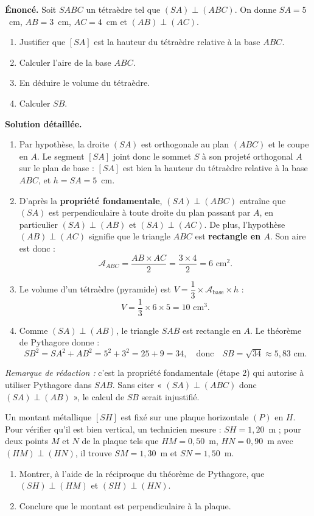 \documentclass[11pt]{article}
\newcommand{\cle}[1]{{\popxbold\color{popdark}#1}}
\begin{document}
\begin{exoresolu}
\textbf{Énoncé.} Soit $SABC$ un tétraèdre tel que $(SA) \perp (ABC)$. On donne $SA = 5$~cm, $AB = 3$~cm, $AC = 4$~cm et $(AB) \perp (AC)$.
\begin{enumerate}
\item Justifier que $[SA]$ est la hauteur du tétraèdre relative à la base $ABC$.
\item Calculer l'aire de la base $ABC$.
\item En déduire le volume du tétraèdre.
\item Calculer $SB$.
\end{enumerate}
\tcblower
\textbf{Solution détaillée.}
\begin{enumerate}
\item Par hypothèse, la droite $(SA)$ est orthogonale au plan $(ABC)$ et le coupe en $A$. Le segment $[SA]$ joint donc le sommet $S$ à son projeté orthogonal $A$ sur le plan de base : $[SA]$ est bien la \cle{hauteur} du tétraèdre relative à la base $ABC$, et $h = SA = 5$~cm.
\item D'après la \textbf{propriété fondamentale}, $(SA) \perp (ABC)$ entraîne que $(SA)$ est perpendiculaire à toute droite du plan passant par $A$, en particulier $(SA) \perp (AB)$ et $(SA) \perp (AC)$. De plus, l'hypothèse $(AB) \perp (AC)$ signifie que le triangle $ABC$ est \textbf{rectangle en $A$}. Son aire est donc :
\[ \mathcal{A}_{ABC} = \frac{AB \times AC}{2} = \frac{3 \times 4}{2} = 6 \text{ cm}^2. \]
\item Le volume d'un tétraèdre (pyramide) est $V = \dfrac{1}{3} \times \mathcal{A}_{\text{base}} \times h$ :
\[ V = \frac{1}{3} \times 6 \times 5 = 10 \text{ cm}^3. \]
\item Comme $(SA) \perp (AB)$, le triangle $SAB$ est rectangle en $A$. Le théorème de Pythagore donne :
\[ SB^2 = SA^2 + AB^2 = 5^2 + 3^2 = 25 + 9 = 34, \quad \text{donc} \quad SB = \sqrt{34} \approx 5{,}83 \text{ cm}. \]
\end{enumerate}
\emph{Remarque de rédaction :} c'est la propriété fondamentale (étape 2) qui autorise à utiliser Pythagore dans $SAB$. Sans citer « $(SA) \perp (ABC)$ donc $(SA) \perp (AB)$ », le calcul de $SB$ serait injustifié.
\end{exoresolu}

\begin{exercice}
Un montant métallique $[SH]$ est fixé sur une plaque horizontale $(P)$ en $H$. Pour vérifier qu'il est bien vertical, un technicien mesure : $SH = 1{,}20$~m ; pour deux points $M$ et $N$ de la plaque tels que $HM = 0{,}50$~m, $HN = 0{,}90$~m avec $(HM) \perp (HN)$, il trouve $SM = 1{,}30$~m et $SN = 1{,}50$~m.
\begin{enumerate}
\item Montrer, à l'aide de la réciproque du théorème de Pythagore, que $(SH) \perp (HM)$ et $(SH) \perp (HN)$.
\item Conclure que le montant est perpendiculaire à la plaque.
\end{enumerate}
\end{exercice}
\end{document}
